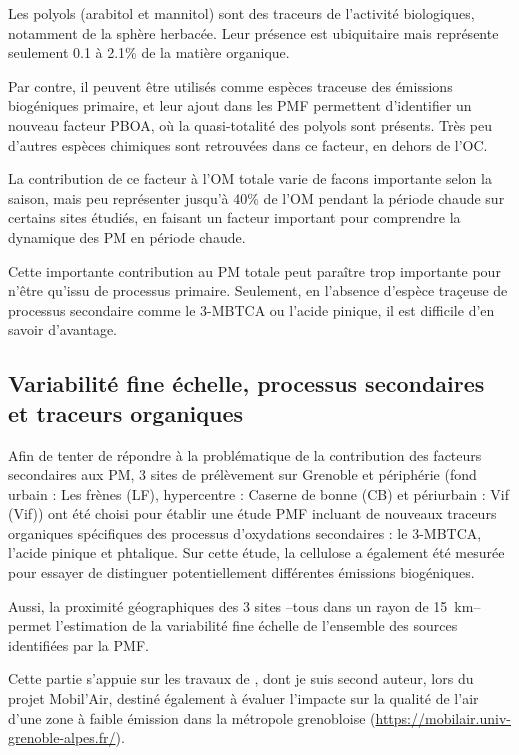 Les polyols (arabitol et mannitol) sont des traceurs de l'activité biologiques, notamment
de la sphère herbacée. Leur présence est ubiquitaire mais représente seulement 0.1 à 2.1\%
de la matière organique.

Par contre, il peuvent être utilisés comme espèces traceuse des émissions biogéniques
primaire, et leur ajout dans les PMF permettent d'identifier un nouveau facteur PBOA,
où la quasi-totalité des polyols sont présents. Très peu d'autres espèces chimiques sont
retrouvées dans ce facteur, en dehors de l'OC.

La contribution de ce facteur à l'OM totale varie de facons importante selon la saison, mais
peu représenter jusqu'à 40\% de l'OM pendant la période chaude sur certains sites étudiés,
en faisant un facteur important pour comprendre la dynamique des PM en période chaude.

Cette importante contribution au PM totale peut paraître trop importante pour n'être
qu'issu de processus primaire. Seulement, en l'absence d'espèce traçeuse de processus
secondaire comme le 3-MBTCA ou l'acide pinique, il est difficile d'en savoir d'avantage.

\subsection{Variabilité fine échelle, processus secondaires et traceurs organiques}%
\label{sub:processus_secondaires}

Afin de tenter de répondre à la problématique de la contribution des facteurs secondaires
aux PM, 3 sites de prélèvement sur Grenoble et périphérie (fond urbain : Les frènes (LF),
hypercentre : Caserne de bonne (CB) et périurbain : Vif (Vif)) ont été choisi pour établir une
étude PMF incluant de nouveaux traceurs organiques spécifiques des processus d'oxydations
secondaires : le 3-MBTCA, l'acide pinique et phtalique. Sur cette étude, la cellulose a
également été mesurée pour essayer de distinguer potentiellement différentes émissions
biogéniques.

Aussi, la proximité géographiques des 3 sites --tous dans un rayon de \SI{15}{\kilo\m}--
permet l'estimation de la variabilité fine échelle de l'ensemble des sources identifiées
par la PMF.

\begin{tcolorbox}[colback=red!5!white,colframe=Melon,title=Note]
    Cette partie s'appuie sur les travaux de \cite{borlazaFinescaleinprep.}, dont je suis
    second auteur, lors du projet Mobil'Air, destiné également à évaluer l'impacte sur la
    qualité de l'air d'une zone à faible émission dans la métropole grenobloise 
    (\url{https://mobilair.univ-grenoble-alpes.fr/}).
\end{tcolorbox}

